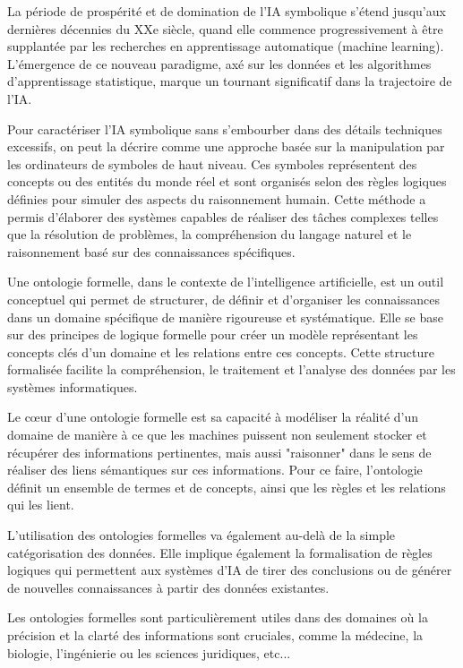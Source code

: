 \documentclass[12pt]{report}
\begin{document}
La période de prospérité et de domination de l'IA symbolique s'étend jusqu'aux dernières décennies du XXe siècle, quand elle commence progressivement à être supplantée par les recherches en apprentissage automatique (machine learning). L'émergence de ce nouveau paradigme, axé sur les données et les algorithmes d'apprentissage statistique, marque un tournant significatif dans la trajectoire de l'IA.

Pour caractériser l'IA symbolique sans s'embourber dans des détails techniques excessifs, on peut la décrire comme une approche basée sur la manipulation par les ordinateurs de symboles de haut niveau. Ces symboles représentent des concepts ou des entités du monde réel et sont organisés selon des règles logiques définies pour simuler des aspects du raisonnement humain. Cette méthode a permis d'élaborer des systèmes capables de réaliser des tâches complexes telles que la résolution de problèmes, la compréhension du langage naturel et le raisonnement basé sur des connaissances spécifiques.

Une ontologie formelle, dans le contexte de l'intelligence artificielle, est un outil conceptuel qui permet de structurer, de définir et d'organiser les connaissances dans un domaine spécifique de manière rigoureuse et systématique. Elle se base sur des principes de logique formelle pour créer un modèle représentant les concepts clés d'un domaine et les relations entre ces concepts. Cette structure formalisée facilite la compréhension, le traitement et l'analyse des données par les systèmes informatiques.

Le cœur d'une ontologie formelle est sa capacité à modéliser la réalité d'un domaine de manière à ce que les machines puissent non seulement stocker et récupérer des informations pertinentes, mais aussi "raisonner" dans le sens de réaliser des liens sémantiques sur ces informations. Pour ce faire, l'ontologie définit un ensemble de termes et de concepts, ainsi que les règles et les relations qui les lient. 

L'utilisation des ontologies formelles va également au-delà de la simple catégorisation des données. Elle implique également la formalisation de règles logiques qui permettent aux systèmes d'IA de tirer des conclusions ou de générer de nouvelles connaissances à partir des données existantes. 

Les ontologies formelles sont particulièrement utiles dans des domaines où la précision et la clarté des informations sont cruciales, comme la médecine, la biologie, l'ingénierie ou les sciences juridiques, etc...
\end{document}
